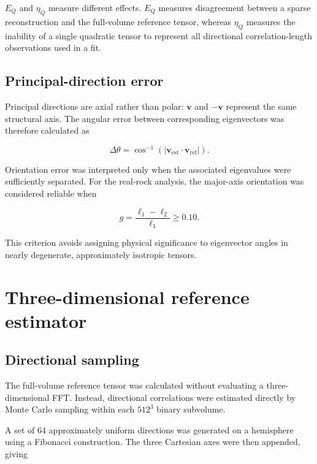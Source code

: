 \documentclass{article}
\begin{document}
$E_Q$ and $\eta_Q$ measure different effects. $E_Q$ measures disagreement
between a sparse reconstruction and the full-volume reference tensor,
whereas $\eta_Q$ measures the inability of a single quadratic tensor to
represent all directional correlation-length observations used in a fit.

\subsection{Principal-direction error}
\label{sec:SI_orientation}

Principal directions are axial rather than polar: $\mathbf{v}$ and
$-\mathbf{v}$ represent the same structural axis. The angular error
between corresponding eigenvectors was therefore calculated as

\begin{equation}
    \Delta\theta
    =
    \cos^{-1}
    \left(
    \left|
    \mathbf{v}_{\mathrm{est}}
    \cdot
    \mathbf{v}_{\mathrm{ref}}
    \right|
    \right).
\end{equation}

Orientation error was interpreted only when the associated eigenvalues
were sufficiently separated. For the real-rock analysis, the major-axis
orientation was considered reliable when

\begin{equation}
    g=
    \frac{\ell_1-\ell_2}{\ell_1}
    \geq 0.10.
\end{equation}

This criterion avoids assigning physical significance to eigenvector
angles in nearly degenerate, approximately isotropic tensors.

\section{Three-dimensional reference estimator}
\label{sec:SI_reference}

\subsection{Directional sampling}
\label{sec:SI_reference_directions}

The full-volume reference tensor was calculated without evaluating a
three-dimensional FFT. Instead, directional correlations were estimated
directly by Monte Carlo sampling within each $512^3$ binary subvolume.

A set of 64 approximately uniform directions was generated on a
hemisphere using a Fibonacci construction. The three Cartesian axes were
then appended, giving
\end{document}
